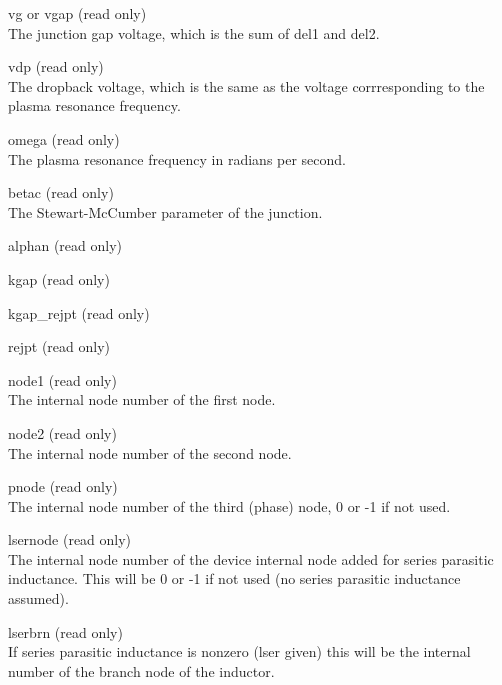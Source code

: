 \begin{description}
\item{\vt vg} or {\vt vgap} (read only)\\
The junction gap voltage, which is the sum of {\vt del1} and {\vt
del2}.

\item{\vt vdp} (read only)\\
The dropback voltage, which is the same as the voltage corrresponding
to the plasma resonance frequency.

\item{\vt omega} (read only)\\
The plasma resonance frequency in radians per second.

\item{\vt betac} (read only)\\
The Stewart-McCumber parameter of the junction.

\item{\vt alphan} (read only)\\

\item{\vt kgap} (read only)\\

\item{\vt kgap_rejpt} (read only)\\

\item{\vt rejpt} (read only)\\

\item{\vt node1} (read only)\\
The internal node number of the first node.

\item{\vt node2} (read only)\\
The internal node number of the second node.

\item{\vt pnode} (read only)\\
The internal node number of the third (phase) node, 0 or -1 if not
used.

\item{\vt lsernode} (read only)\\
The internal node number of the device internal node added for series
parasitic inductance.  This will be 0 or -1 if not used (no series
parasitic inductance assumed).

\item{\vt lserbrn} (read only)\\
If series parasitic inductance is nonzero ({\vt lser} given) this will
be the internal number of the branch node of the inductor.


\end{description}
